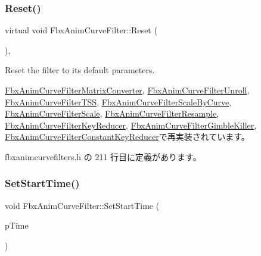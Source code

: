 \subsubsection{\texorpdfstring{Reset()}{Reset()}}
{\footnotesize\ttfamily virtual void Fbx\+Anim\+Curve\+Filter\+::\+Reset (\begin{DoxyParamCaption}{ }\end{DoxyParamCaption})\hspace{0.3cm}{\ttfamily [inline]}, {\ttfamily [virtual]}}

Reset the filter to its default parameters. 

\hyperlink{class_fbx_anim_curve_filter_matrix_converter_ad441f2753722fa3fd07631fb249afadb}{Fbx\+Anim\+Curve\+Filter\+Matrix\+Converter}, \hyperlink{class_fbx_anim_curve_filter_unroll_a0587dd664dddb98a809043f030b409d6}{Fbx\+Anim\+Curve\+Filter\+Unroll}, \hyperlink{class_fbx_anim_curve_filter_t_s_s_aebf5798bd833f7dced2a11aea61b1c35}{Fbx\+Anim\+Curve\+Filter\+T\+SS}, \hyperlink{class_fbx_anim_curve_filter_scale_by_curve_afa7aab42520287edf327d78dcbbb0d01}{Fbx\+Anim\+Curve\+Filter\+Scale\+By\+Curve}, \hyperlink{class_fbx_anim_curve_filter_scale_a40e82207d205b026aaab40e52a7184c8}{Fbx\+Anim\+Curve\+Filter\+Scale}, \hyperlink{class_fbx_anim_curve_filter_resample_a149622ab0dd1ffd26ca1e59f31aaed93}{Fbx\+Anim\+Curve\+Filter\+Resample}, \hyperlink{class_fbx_anim_curve_filter_key_reducer_a52e9e7476a3c4e55ad7c41c978b92cd5}{Fbx\+Anim\+Curve\+Filter\+Key\+Reducer}, \hyperlink{class_fbx_anim_curve_filter_gimble_killer_ad0c8bbf400bc208412b088d9c5b702a5}{Fbx\+Anim\+Curve\+Filter\+Gimble\+Killer}, \hyperlink{class_fbx_anim_curve_filter_constant_key_reducer_a6961f8cd2d86b3f0b0c503c021bac93b}{Fbx\+Anim\+Curve\+Filter\+Constant\+Key\+Reducer}で再実装されています。



 fbxanimcurvefilters.\+h の 211 行目に定義があります。

\mbox{\label{class_fbx_anim_curve_filter_ad5833e1664b9621b4bafef76944ad383}} 
\subsubsection{\texorpdfstring{Set\+Start\+Time()}{SetStartTime()}}
{\footnotesize\ttfamily void Fbx\+Anim\+Curve\+Filter\+::\+Set\+Start\+Time (\begin{DoxyParamCaption}\item[{\hyperlink{class_fbx_time}{Fbx\+Time} \&}]{p\+Time }\end{DoxyParamCaption})\hspace{0.3cm}{\ttfamily [inline]}}

